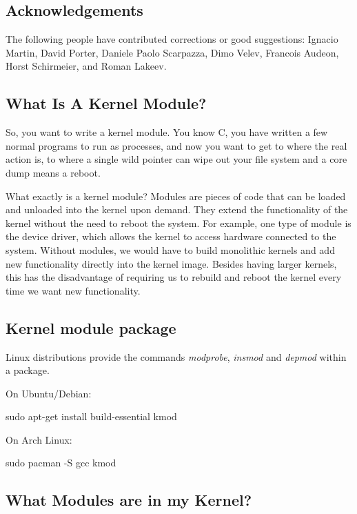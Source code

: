 \documentclass[10pt, oneside]{book}
\begin{document}
\subsection{Acknowledgements}
\label{sec:acknowledgements}

The following people have contributed corrections or good suggestions: Ignacio Martin, David Porter, Daniele Paolo Scarpazza, Dimo Velev, Francois Audeon, Horst Schirmeier, and Roman Lakeev.

\subsection{What Is A Kernel Module?}
\label{sec:kernelmod}

So, you want to write a kernel module.
You know C, you have written a few normal programs to run as processes, and now you want to get to where the real action is, to where a single wild pointer can wipe out your file system and a core dump means a reboot.

What exactly is a kernel module?
Modules are pieces of code that can be loaded and unloaded into the kernel upon demand.
They extend the functionality of the kernel without the need to reboot the system.
For example, one type of module is the device driver, which allows the kernel to access hardware connected to the system.
Without modules, we would have to build monolithic kernels and add new functionality directly into the kernel image.
Besides having larger kernels, this has the disadvantage of requiring us to rebuild and reboot the kernel every time we want new functionality.

\subsection{Kernel module package}
\label{sec:packages}

Linux distributions provide the commands \emph{modprobe}, \emph{insmod} and \emph{depmod} within a package.

On Ubuntu/Debian:
\begin{codebash}
sudo apt-get install build-essential kmod
\end{codebash}

On Arch Linux:
\begin{codebash}
sudo pacman -S gcc kmod
\end{codebash}

\subsection{What Modules are in my Kernel?}
\label{sec:modutils}
\end{document}
